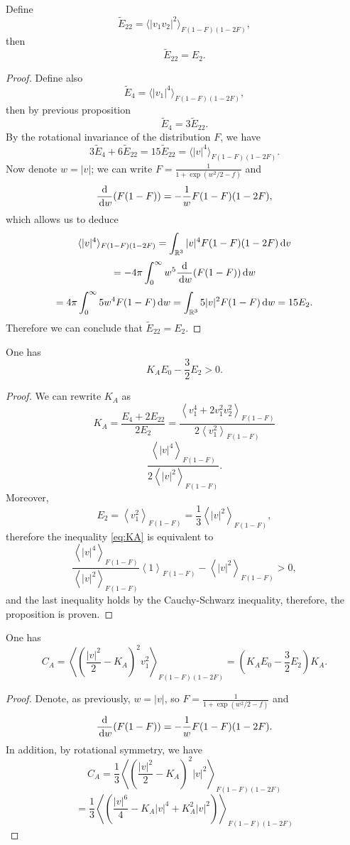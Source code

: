 \begin{subappendices}
\begin{proposition}%
Define  
\[   \tilde E_{22}=\langle |v_1v_2|^2\rangle_{F(1-F)(1-2F)}, \] 
	then \[\tilde E_{22} =  E_2 .\]
\end{proposition}
\begin{proof}
	Define also \[\tilde E_4 =\langle |v_1|^4\rangle_{F(1-F)(1-2F)}, \] then by previous proposition
	\[\tilde E_4=3\tilde E_{22}.\]
	By the rotational invariance of the distribution $F$, we have
	\[3 \tilde E_4+6\tilde E_{22}  = 15\tilde E_{22} = \langle |v|^4\rangle_{F(1-F)(1-2F)}.\] 
Now denote $w=|v|$; we can write $F=\frac{1}{1+\exp(w^2/2-f)}$ and
\[\frac{\mathrm d}{{\,\mathrm{d} w}}(F(1-F)) = -\frac{1}{ w}F(1-F)(1-2F),\]
which allows us to deduce
\[\langle |v|^4\rangle_{F(1-F)(1-2F)}  = \int_{\mathbb {R}^3} |v|^4 F(1-F)(1-2F){\,\mathrm{d} v}  \]
\[ =-4\pi \int_0^\infty w^5  \frac{\mathrm d}{{\,\mathrm{d} w}}(F(1-F)) {\,\mathrm{d} w} \]
\[=4\pi \int_0^\infty 5w^4 F(1-F){\,\mathrm{d} w} = \int_{\mathbb {R}^3}  5 |v|^2 F(1-F){\,\mathrm{d} w} = {15} E_2. \]
Therefore we can conclude that $\tilde E_{22}= {E_2}  $.
\end{proof}
\begin{proposition}
	One has 
  \begin{equation} 
	K_AE_0 -\frac{3}{2}  E_2 >0.
\end{equation} 

\end{proposition}
\begin{proof} 
We can rewrite $K_A$ as 
\[K_A=\frac{E_4+2E_{22}}{2E_2} = \frac{\left\langle v_1^4+2v_1^2v_2^2\right\rangle_{F(1-F)}}{2\left\langle v_1^2\right\rangle_{F(1-F)}}\]
\[\frac{\left\langle |v|^4 \right\rangle_{F(1-F)}}{2\left\langle |v|^2\right\rangle_{F(1-F)}}.\]
Moreover,
\[E_2 = \left\langle v_1^2\right\rangle_{F(1-F)} =\frac 13\left\langle |v|^2\right\rangle_{F(1-F)}, \]
therefore the inequality \eqref{eq:KA} is equivalent to
\[ \frac{\left\langle |v|^4 \right\rangle_{F(1-F)}}{ \left\langle |v|^2\right\rangle_{F(1-F)}} \left\langle 1 \right\rangle_{F(1-F)}  -  \left\langle |v|^2 \right\rangle_{F(1-F)} >0, \]
and the last inequality holds by the Cauchy-Schwarz inequality, therefore, the proposition is proven.
\end{proof}

\begin{proposition} One has
		\[C_A=  \left\langle   \left(\frac{|v|^2}{2}-K_A\right)^2 v_1^2
\right\rangle_{F(1-F)(1-2F)}=\left( K_AE_0 -\frac{3}{2}  E_2 \right)K_A.\]
\end{proposition}
\begin{proof}
Denote, as previously, $w=|v|$, so $F=\frac{1}{1+\exp(w^2/2-f)}$ and
\[\frac{\mathrm d}{{\,\mathrm{d} w}}(F(1-F)) = -\frac{1}{ w}F(1-F)(1-2F).\]
In addition, by rotational symmetry, we have 
\[C_A=  \frac 13\left\langle   \left(\frac{|v|^2}{2}-K_A\right)^2 |v|^2
\right\rangle_{F(1-F)(1-2F)}\]
\[=\frac 13\left\langle   \left(\frac{|v|^6}{4}-K_A|v|^4+K^2_A|v|^2\right)  
\right\rangle_{F(1-F)(1-2F)}\]


\end{proof}
\end{subappendices}
